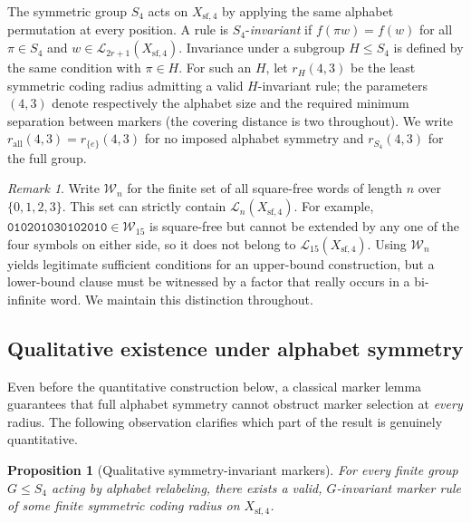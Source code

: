 \documentclass[11pt]{article}
\newtheorem{proposition}[theorem]{Proposition}
\theoremstyle{remark}
\newtheorem{remark}[theorem]{Remark}
\newcommand{\SigmaFour}{\{0,1,2,3\}}
\newcommand{\Xsf}{X_{\mathrm{sf},4}}
\newcommand{\Lang}{\mathcal{L}}
\newcommand{\Sym}{S_4}
\begin{document}
The symmetric group $\Sym$ acts on $\Xsf$ by applying the same
alphabet permutation at every position. A rule is
$\Sym$-\emph{invariant} if
$f(\pi w)=f(w)$ for all $\pi\in\Sym$ and
$w\in\Lang_{2r+1}(\Xsf)$. Invariance under a subgroup $H\le\Sym$ is defined
by the same condition with $\pi\in H$. For such an
$H$, let $r_H(4,3)$ be the least symmetric coding
radius admitting a valid $H$-invariant rule; the
parameters $(4,3)$ denote respectively the alphabet
size and the required minimum separation between
markers (the covering distance is two throughout).
We write $r_{\mathrm{all}}(4,3)=r_{\{e\}}(4,3)$
for no imposed alphabet symmetry and
$r_{\Sym}(4,3)$ for the full group.

\begin{remark}
Write $\mathcal W_n$ for the finite set of all square-free words
of length $n$ over $\SigmaFour$. This set can strictly contain
$\Lang_n(\Xsf)$. For example,
$\texttt{010201030102010}\in\mathcal W_{15}$
is square-free but cannot be extended by
any one of the four symbols on either side,
so it does not belong to $\Lang_{15}(\Xsf)$.
Using $\mathcal W_n$ yields
legitimate sufficient conditions for an upper-bound construction, but
a lower-bound clause must be witnessed by a factor that really occurs
in a bi-infinite word. We maintain this distinction throughout.
\end{remark}

\subsection{Qualitative existence under alphabet symmetry}

Even before the quantitative construction below, a classical marker
lemma guarantees that full alphabet symmetry cannot obstruct marker
selection at \emph{every} radius. The following observation clarifies
which part of the result is genuinely quantitative.

\begin{proposition}[Qualitative symmetry-invariant markers]
\label{prop:existence}
For every finite group $G\le S_4$ acting by alphabet relabeling,
there exists a valid, $G$-invariant marker rule of some finite
symmetric coding radius on $\Xsf$.
\end{proposition}
\end{document}
